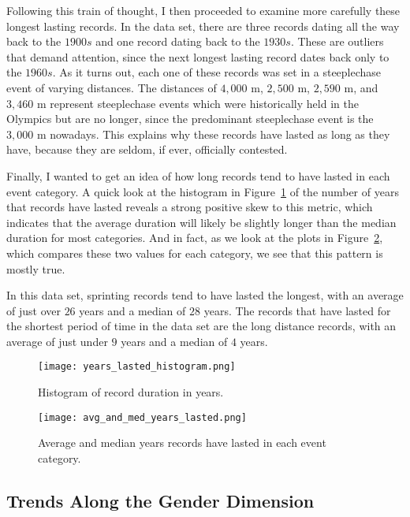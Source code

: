 \documentclass{article}
\begin{document}
Following this train of thought, I then proceeded to examine more carefully these longest lasting records.  In the 
data set, there are three records dating all the way back to the $1900s$ and one record dating back to the $1930s$.  
These are outliers that demand attention, since the next longest lasting record dates back only to the $1960s$.  As 
it turns out, each one of these records was set in a steeplechase event of varying distances.  The distances of 
$4,000$ m, $2,500$ m, $2,590$ m, and $3,460$ m represent steeplechase events which were historically held in the Olympics 
but are no longer, since the predominant steeplechase event is the $3,000$ m nowadays.  This explains why these records 
have lasted as long as they have, because they are seldom, if ever, officially contested.  

Finally, I wanted to get an idea of how long records tend to have lasted in each event category.  A quick look at the 
histogram in Figure~\ref{fig:hist} of the number of years that records have lasted reveals a strong positive skew to 
this metric, which indicates that the average duration will likely be slightly longer than the median duration for 
most categories.  And in fact, as we look at the plots in Figure~\ref{fig:avg_med}, which compares these two values 
for each category, we see that this pattern is mostly true.  

In this data set, sprinting records tend to have lasted the longest, with an average of just over $26$ years and a 
median of $28$ years.  The records that have lasted for the shortest period of time in the data set are the long 
distance records, with an average of just under $9$ years and a median of $4$ years.  

\begin{figure}
    \centering
    \texttt{[image: years\_lasted\_histogram.png]}
    \caption{Histogram of record duration in years.}
    \label{fig:hist}
\end{figure}

\begin{figure}
    \centering
    \texttt{[image: avg\_and\_med\_years\_lasted.png]}
    \caption{Average and median years records have lasted in each event category.}
    \label{fig:avg_med}
\end{figure}

\subsection{Trends Along the Gender Dimension}
\end{document}
